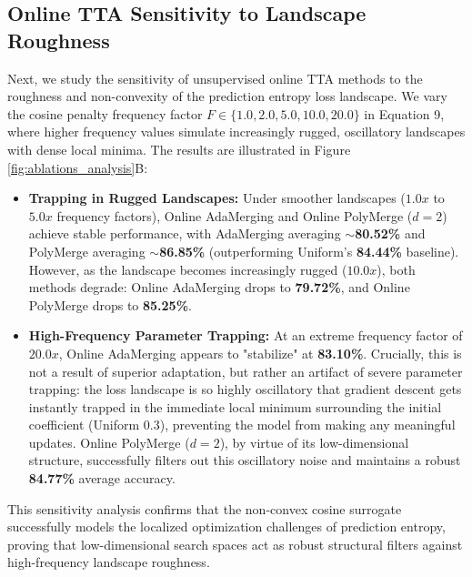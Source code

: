 \documentclass{article}
\theoremstyle{plain}
\theoremstyle{definition}
\theoremstyle{remark}
\begin{document}
\subsection{Online TTA Sensitivity to Landscape Roughness}
Next, we study the sensitivity of unsupervised online TTA methods to the roughness and non-convexity of the prediction entropy loss landscape. We vary the cosine penalty frequency factor $F \in \{1.0, 2.0, 5.0, 10.0, 20.0\}$ in Equation 9, where higher frequency values simulate increasingly rugged, oscillatory landscapes with dense local minima. The results are illustrated in Figure \ref{fig:ablations_analysis}B:
\begin{itemize}
    \item \textbf{Trapping in Rugged Landscapes:} Under smoother landscapes ($1.0x$ to $5.0x$ frequency factors), Online AdaMerging and Online PolyMerge ($d=2$) achieve stable performance, with AdaMerging averaging $\sim$\textbf{80.52\%} and PolyMerge averaging $\sim$\textbf{86.85\%} (outperforming Uniform's \textbf{84.44\%} baseline). However, as the landscape becomes increasingly rugged ($10.0x$), both methods degrade: Online AdaMerging drops to \textbf{79.72\%}, and Online PolyMerge drops to \textbf{85.25\%}.
    \item \textbf{High-Frequency Parameter Trapping:} At an extreme frequency factor of $20.0x$, Online AdaMerging appears to "stabilize" at \textbf{83.10\%}. Crucially, this is not a result of superior adaptation, but rather an artifact of severe parameter trapping: the loss landscape is so highly oscillatory that gradient descent gets instantly trapped in the immediate local minimum surrounding the initial coefficient (Uniform 0.3), preventing the model from making any meaningful updates. Online PolyMerge ($d=2$), by virtue of its low-dimensional structure, successfully filters out this oscillatory noise and maintains a robust \textbf{84.77\%} average accuracy.
\end{itemize}
This sensitivity analysis confirms that the non-convex cosine surrogate successfully models the localized optimization challenges of prediction entropy, proving that low-dimensional search spaces act as robust structural filters against high-frequency landscape roughness.
\end{document}
